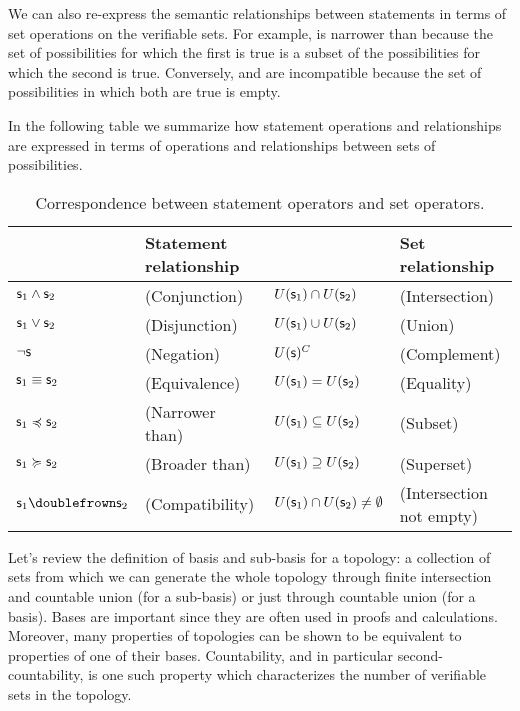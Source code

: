 \documentclass[11pt,letterpaper,fleqn]{memoir} %
\begin{document}
We can also re-express the semantic relationships between statements in terms of set operations on the verifiable sets. For example,  is narrower than  because the set of possibilities for which the first is true is a subset of the possibilities for which the second is true. Conversely,  and  are incompatible because the set of possibilities in which both are true is empty.

In the following table we summarize how statement operations and relationships are expressed in terms of operations and relationships between sets of possibilities.

\begin{table}[h]
	\centering
	\begin{tabular}{p{} p{} p{} p{}}
		& Statement relationship & & Set relationship  \\ 
		\hline 
		$\mathsf{s}_1 \wedge \mathsf{s}_2$ & (Conjunction) & $U(\mathsf{s}_1) \cap U(\mathsf{s}_2)$ & (Intersection) \\ 
		$\mathsf{s}_1 \vee \mathsf{s}_2$ & (Disjunction) & $U(\mathsf{s}_1) \cup U(\mathsf{s}_2)$ & (Union) \\ 
		$\neg \mathsf{s}$ & (Negation) & $U(\mathsf{s})^C$ & (Complement) \\ 
		$\mathsf{s}_1 \equiv \mathsf{s}_2$ & (Equivalence) & $U(\mathsf{s}_1) = U(\mathsf{s}_2)$ & (Equality) \\ 
		$\mathsf{s}_1 \preccurlyeq \mathsf{s}_2$ & (Narrower than) & $U(\mathsf{s}_1) \subseteq U(\mathsf{s}_2)$ & (Subset) \\ 
		$\mathsf{s}_1 \succcurlyeq \mathsf{s}_2$ & (Broader than) & $U(\mathsf{s}_1) \supseteq U(\mathsf{s}_2)$ & (Superset) \\ 
		$\stmt_1 \comp \stmt_2$ & (Compatibility) & $U(\mathsf{s}_1) \cap U(\mathsf{s}_2) \neq \emptyset$ & (Intersection not empty)
	\end{tabular} 
	\caption{Correspondence between statement operators and set operators.}
\end{table}

Let's review the definition of basis and sub-basis for a topology: a collection of sets from which we can generate the whole topology through finite intersection and countable union (for a sub-basis) or just through countable union (for a basis). Bases are important since they are often used in proofs and calculations. Moreover, many properties of topologies can be shown to be equivalent to properties of one of their bases. Countability, and in particular second-countability, is one such property which characterizes the number of verifiable sets in the topology.
\end{document}
